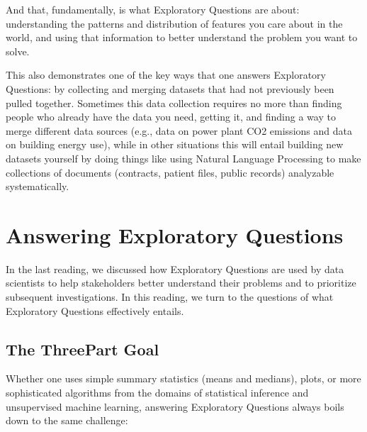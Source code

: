 \documentclass[letterpaper,10pt,english]{jupyterBook}
\begin{document}
\sphinxAtStartPar
And that, fundamentally, is what Exploratory Questions are about: understanding the patterns and distribution of features you care about in the world, and using that information to better understand the problem you want to solve.

\sphinxAtStartPar
This also demonstrates one of the key ways that one answers Exploratory Questions: by collecting and merging datasets that had not previously been pulled together. Sometimes this data collection requires no more than finding people who already have the data you need, getting it, and finding a way to merge different data sources (e.g., data on power plant CO2 emissions and data on building energy use), while in other situations this will entail building new datasets yourself by doing things like using Natural Language Processing to make collections of documents (contracts, patient files, public records) analyzable systematically.

\sphinxstepscope


\chapter{Answering Exploratory Questions}
\label{\detokenize{30_questions/15_answering_exploratory_questions:answering-exploratory-questions}}\label{\detokenize{30_questions/15_answering_exploratory_questions::doc}}
\sphinxAtStartPar
In the last reading, we discussed how Exploratory Questions are used by data scientists to help stakeholders better understand their problems and to prioritize subsequent investigations. In this reading, we turn to the questions of what  Exploratory Questions effectively entails.


\section{The Three\sphinxhyphen{}Part Goal}
\label{\detokenize{30_questions/15_answering_exploratory_questions:the-three-part-goal}}
\sphinxAtStartPar
Whether one uses simple summary statistics (means and medians), plots, or more sophisticated algorithms from the domains of statistical inference and unsupervised machine learning, answering Exploratory Questions always boils down to the same challenge:

\sphinxAtStartPar
{}
\end{document}
